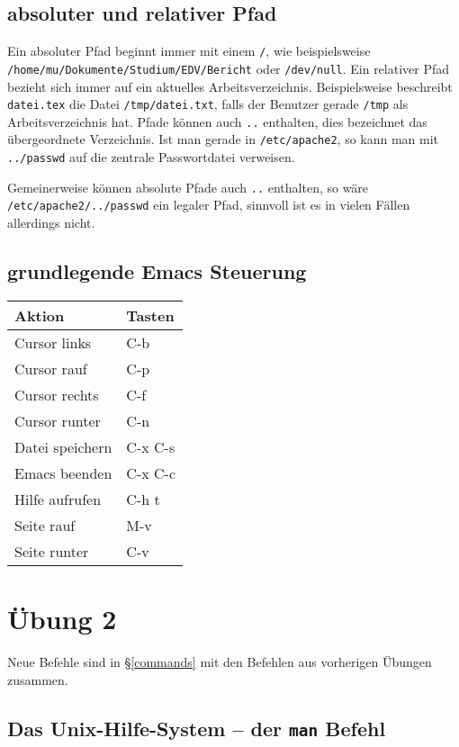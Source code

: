 \documentclass[10pt]{article}
\begin{document}
\subsection{absoluter und relativer Pfad}

Ein absoluter Pfad beginnt immer mit einem \texttt{/}, wie beispielsweise \\ \texttt{/home/mu/Dokumente/Studium/EDV/Bericht} oder \texttt{/dev/null}. Ein relativer Pfad bezieht sich immer auf ein aktuelles Arbeitsverzeichnis. Beispielsweise beschreibt \texttt{datei.tex} die Datei \texttt{/tmp/datei.txt}, falls der Benutzer gerade \texttt{/tmp} als Arbeitsverzeichnis hat. Pfade können auch \texttt{..} enthalten, dies bezeichnet das übergeordnete Verzeichnis. Ist man gerade in \texttt{/etc/apache2}, so kann man mit \texttt{../passwd} auf die zentrale Passwortdatei verweisen.

Gemeinerweise können absolute Pfade auch \texttt{..} enthalten, so wäre \\
\texttt{/etc/apache2/../passwd} ein legaler Pfad, sinnvoll ist es in vielen Fällen allerdings nicht.

\subsection{grundlegende Emacs Steuerung}

\begin{tabular}{ll}
Aktion & Tasten \\
\hline
Cursor links & C-b \\
Cursor rauf & C-p \\
Cursor rechts & C-f \\
Cursor runter & C-n \\
Datei speichern & C-x C-s \\
Emacs beenden & C-x C-c \\
Hilfe aufrufen & C-h t \\
Seite rauf & M-v \\
Seite runter & C-v \\
\end{tabular}

\section{Übung 2}

Neue Befehle sind in §\ref{commands} mit den Befehlen aus vorherigen Übungen zusammen.

\subsection{Das Unix-Hilfe-System -- der \texttt{man} Befehl}
\end{document}
